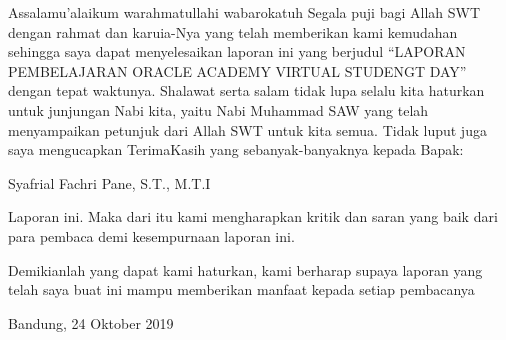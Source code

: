 \begin{acknowledgements}
\par
Assalamu’alaikum warahmatullahi wabarokatuh
Segala puji bagi Allah SWT dengan rahmat dan karuia-Nya yang telah memberikan kami kemudahan sehingga saya dapat menyelesaikan laporan ini yang  berjudul “LAPORAN PEMBELAJARAN ORACLE ACADEMY VIRTUAL STUDENGT DAY” dengan tepat waktunya.
Shalawat serta salam tidak lupa selalu kita haturkan untuk junjungan Nabi kita, yaitu Nabi Muhammad SAW yang telah menyampaikan petunjuk dari Allah SWT untuk kita semua.
Tidak luput juga saya mengucapkan TerimaKasih yang sebanyak-banyaknya kepada Bapak:

Syafrial Fachri Pane, S.T., M.T.I

Laporan ini. Maka dari itu kami mengharapkan kritik dan saran yang baik dari para pembaca demi kesempurnaan laporan ini.

Demikianlah yang dapat kami haturkan, kami berharap supaya laporan yang telah saya buat ini mampu memberikan manfaat kepada setiap pembacanya


\begin{raggedleft}












Bandung, 24 Oktober 2019



\end{raggedleft}

\end{acknowledgements}